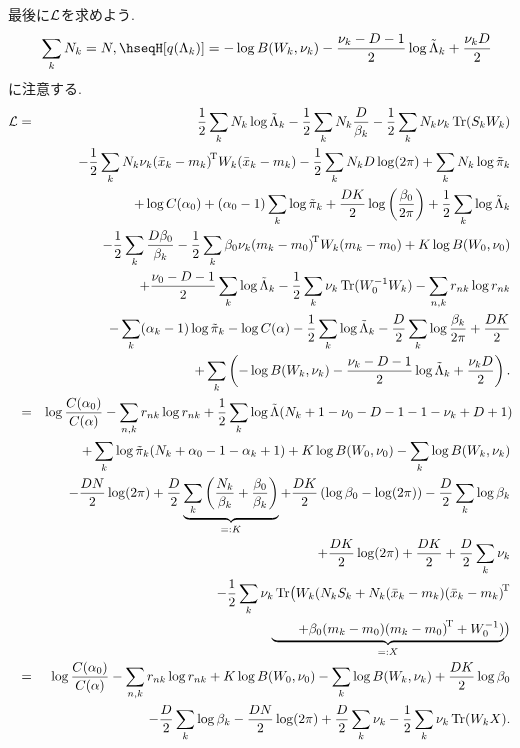 最後に${\cal L}$を求めよう.
\begin{eqnarray*}&&
\sum_k N_k=N,
\hseq%
H[q(\Lambda_k)]=-\log B(W_k,\nu_k)-\frac{\nu_k-D-1}{2}\log \tilde{\Lambda}_k+\frac{\nu_k D}{2}
\end{eqnarray*}
に注意する.
\begin{eqnarray*}
\calL
 &=& \half \sum_k N_k \log \tilde{\Lambda}_k-\half \sum_k N_k \frac{D}{\beta_k}-\half \sum_k N_k \nu_k \tr(S_k W_k)
\\&&- \half \sum_k N_k \nu_k\quads{W_k}{(\bar{x}_k-m_k)}
    - \half \sum_k N_k D \log(2\pi)+\sum_k N_k \log \tilde{\pi}_k
\\&&+ \log C(\alpha_0)+(\alpha_0-1)\sum_k \log \tilde{\pi}_k+\frac{DK}{2}\log \left(\frac{\beta_0}{2\pi}\right)
    + \half \sum_k \log \tilde{\Lambda}_k
\\&&- \half \sum_k \frac{D\beta_0}{\beta_k}-\half\sum_k \beta_0 \nu_k \quads{W_k}{(m_k-m_0)}
    + K \log B(W_0,\nu_0)\\
 &&+ \frac{\nu_0-D-1}{2}\sum_k \log \tilde{\Lambda}_k-\half \sum_k \nu_k\tr(W_0^{-1}W_k) - \sum_{n,k}r_{nk}\log r_{nk}\\
 &&- \sum_k (\alpha_k-1)\log \tilde{\pi}_k -\log C(\alpha) - \half \sum_k \log \tilde{\Lambda}_k - \frac{D}{2}\sum_k \log \frac{\beta_k}{2\pi} +\frac{DK}{2}\\
 &&+ \sum_k \left(-\log B(W_k,\nu_k)-\frac{\nu_k-D-1}{2}\log \tilde{\Lambda}_k+\frac{\nu_k D}{2}\right).
\\
 &=& \log \frac{C(\alpha_0)}{C(\alpha)}
     - \sum_{n,k}r_{nk} \log r_{nk} + \half \sum_k \log \tilde{\Lambda}(N_k+1-\nu_0-D-1-1-\nu_k+D+1)\!
\\&&+ \sum_k \log \tilde{\pi}_k(N_k+\alpha_0-1-\alpha_k+1)+K \log B(W_0,\nu_0)- \sum_k \log B(W_k,\nu_k)
\\&&- \frac{DN}{2}\log (2\pi)
    + \frac{D}{2}\underbrace{\sum_k\left(\frac{N_k}{\beta_k}+\frac{\beta_0}{\beta_k}\right)}_{=:K}
    + \frac{DK}{2}\left(\log \beta_0-\log (2\pi)\right)-\frac{D}{2}\sum_k \log \beta_k
\\&&+ \frac{DK}{2}\log (2\pi)
    + \frac{DK}{2}+ \frac{D}{2}\sum_k \nu_k
\\&&- \half \sum_k \nu_k \tr\bigl(W_k
    (N_k S_k+N_k\outp{(\bar{x}_k-m_k)}\\
 &&\hphantom{-   \half \sum_k \nu_k \tr\bigl(W_k}
   \underbrace{\qquad+\beta_0\outp{(m_k-m_0)}+W_0^{-1})}_{=:X}\bigr)\\
 &=& \log \frac{C(\alpha_0)}{C(\alpha)}-\sum_{n,k}r_{nk}\log r_{nk}+K \log B(W_0,\nu_0)-\sum_k \log B(W_k,\nu_k)+\frac{DK}{2}\log \beta_0\\
 &&- \frac{D}{2}\sum_k \log \beta_k
 - \frac{DN}{2}\log (2\pi) + \frac{D}{2}\sum_k \nu_k -\half \sum_k \nu_k \tr (W_k X).
\end{eqnarray*}
